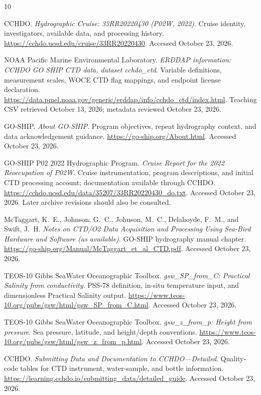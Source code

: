 \documentclass[11pt,letterpaper]{article}
\begin{document}
\clearpage
{}
\begin{thebibliography}{10}

CCHDO. \emph{Hydrographic Cruise: 33RR20220430 (P02W, 2022)}. Cruise identity, investigators, available data, and processing history.
\url{https://cchdo.ucsd.edu/cruise/33RR20220430}.
Accessed October 23, 2026.

NOAA Pacific Marine Environmental Laboratory. \emph{ERDDAP information: CCHDO GO SHIP CTD data, dataset cchdo\_ctd}. Variable definitions, measurement scales, WOCE CTD flag mappings, and endpoint license declaration.
\url{https://data.pmel.noaa.gov/generic/erddap/info/cchdo_ctd/index.html}.
Teaching CSV retrieved October 13, 2026; metadata reviewed October 23, 2026.

GO-SHIP. \emph{About GO-SHIP}. Program objectives, repeat hydrography context, and data acknowledgement guidance.
\url{https://go-ship.org/About.html}.
Accessed October 23, 2026.

GO-SHIP P02 2022 Hydrographic Program. \emph{Cruise Report for the 2022 Reoccupation of P02W}. Cruise instrumentation, program descriptions, and initial CTD processing account; documentation available through CCHDO.
\url{https://cchdo.ucsd.edu/data/35207/33RR20220430_do.txt}.
Accessed October 23, 2026. Later archive revisions should also be consulted.

McTaggart, K.~E., Johnson, G.~C., Johnson, M.~C., Delahoyde, F.~M., and Swift, J.~H.
\emph{Notes on CTD/O2 Data Acquisition and Processing Using Sea-Bird Hardware and Software (as available)}. GO-SHIP hydrography manual chapter.
\url{https://go-ship.org/Manual/McTaggart_et_al_CTD.pdf}.
Accessed October 23, 2026.

TEOS-10 Gibbs SeaWater Oceanographic Toolbox. \emph{gsw\_SP\_from\_C: Practical Salinity from conductivity}. PSS-78 definition, in-situ temperature input, and dimensionless Practical Salinity output.
\url{https://www.teos-10.org/pubs/gsw/html/gsw_SP_from_C.html}.
Accessed October 23, 2026.

TEOS-10 Gibbs SeaWater Oceanographic Toolbox. \emph{gsw\_z\_from\_p: Height from pressure}. Sea pressure, latitude, and height/depth conventions.
\url{https://www.teos-10.org/pubs/gsw/html/gsw_z_from_p.html}.
Accessed October 23, 2026.

CCHDO. \emph{Submitting Data and Documentation to CCHDO---Detailed}. Quality-code tables for CTD instrument, water-sample, and bottle information.
\url{https://learning.cchdo.io/submitting_data/detailed_guide}.
Accessed October 23, 2026.


\end{thebibliography}
\end{document}
